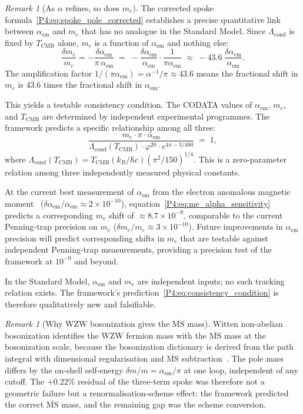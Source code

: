 \documentclass[11pt,a4paper]{article}
\theoremstyle{definition}
\theoremstyle{remark}
\newtheorem{remark}[theorem]{Remark}
\newcommand{\vp}{\varphi}
\newcommand{\TCMB}{T_{\mathrm{CMB}}}
\newcommand{\aInv}{\alpha^{-1}}
\newcommand{\aem}{\alpha_{\mathrm{em}}}
\newcommand{\Lcond}{\Lambda_{\mathrm{cond}}}
\begin{document}
\begin{remark}[As $\alpha$ refines, so does $m_e$]
\label{P4:rem:alpha_me_tracking}
The corrected spoke formula~\eqref{P4:eq:spoke_pole_corrected} establishes
a precise quantitative link between $\aem$ and $m_e$ that has no analogue
in the Standard Model.
Since $\Lcond$ is fixed by $\TCMB$ alone, $m_e$ is a function of $\aem$
and nothing else:
\begin{equation}
  \frac{\delta m_e}{m_e} = -\frac{\delta\aem}{\pi\,\aem}
  \;=\; -\frac{\delta\aem}{\aem}\cdot\frac{1}{\pi\aem}
  \;\approx\; -43.6\;\frac{\delta\aem}{\aem}.
  \label{P4:eq:me_alpha_sensitivity}
\end{equation}
The amplification factor $1/(\pi\aem) = \aInv/\pi \approx 43.6$ means
the fractional shift in $m_e$ is 43.6 times the fractional shift in $\aem$.

This yields a testable consistency condition.
The CODATA values of $\aem$, $m_e$, and $\TCMB$ are determined by
independent experimental programmes.
The framework predicts a specific relationship among all three:
\begin{equation}
  \frac{m_e\cdot\pi\cdot\aem}
       {\Lcond(\TCMB)\cdot\vp^{20}\cdot e^{4\pi-3/400}}
  \;=\; 1,
  \label{P4:eq:consistency_condition}
\end{equation}
where $\Lcond(\TCMB) = \TCMB(k_B/\hbar c)(\pi^2/150)^{1/4}$.
This is a zero-parameter relation among three independently measured
physical constants.

At the current best measurement of $\aem$ from the electron anomalous
magnetic moment~\cite{Hanneke2008} ($\delta\aem/\aem \approx 2\times10^{-10}$),
equation~\eqref{P4:eq:me_alpha_sensitivity} predicts a corresponding
$m_e$ shift of $\approx 8.7\times10^{-9}$, comparable to the current
Penning-trap precision on $m_e$ ($\delta m_e/m_e \approx 3\times10^{-10}$).
Future improvements in $\aem$ precision will predict corresponding
shifts in $m_e$ that are testable against independent Penning-trap
measurements, providing a precision test of the framework at
$10^{-9}$ and beyond.

In the Standard Model, $\aem$ and $m_e$ are independent inputs;
no such tracking relation exists.
The framework's prediction~\eqref{P4:eq:consistency_condition}
is therefore qualitatively new and falsifiable.
\end{remark}

\begin{remark}[Why WZW bosonization gives the $\overline{\mathrm{MS}}$ mass]
\label{P4:rem:msbar_origin}
Witten non-abelian bosonization identifies the WZW fermion mass with the
$\overline{\mathrm{MS}}$ mass at the bosonization scale, because the
bosonization dictionary is derived from the path integral with dimensional
regularisation and $\overline{\mathrm{MS}}$ subtraction~\cite{Witten1984}.
The pole mass differs by the on-shell self-energy
$\delta m/m = \aem/\pi$ at one loop, independent of any cutoff.
The $+0.22\%$ residual of the three-term spoke was therefore
not a geometric failure but a renormalisation-scheme effect:
the framework predicted the correct $\overline{\mathrm{MS}}$ mass,
and the remaining gap was the scheme conversion.
\end{remark}
\end{document}

